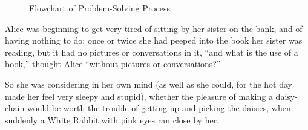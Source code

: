 \documentclass{article}
\begin{document}
\begin{figure}[h]
    \centering
    
    \caption{Flowchart of Problem-Solving Process}
    \label{fig:flowchart}
\end{figure}

Alice was beginning to get very tired of sitting by her sister on the bank, and of having nothing to do: once or twice she had peeped into the book her sister was reading, but it had no pictures or conversations in it, ``and what is the use of a book,'' thought Alice ``without pictures or conversations?''

So she was considering in her own mind (as well as she could, for the hot day made her feel very sleepy and stupid), whether the pleasure of making a daisy-chain would be worth the trouble of getting up and picking the daisies, when suddenly a White Rabbit with pink eyes ran close by her.
\end{document}
